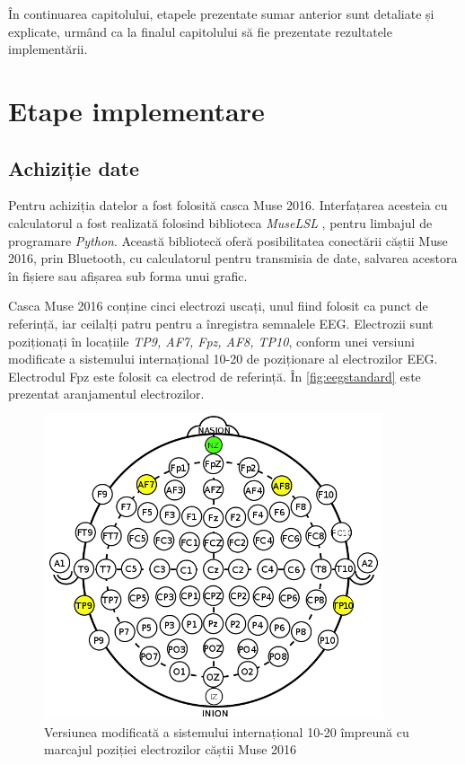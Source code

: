 În continuarea capitolului, etapele prezentate sumar anterior sunt detaliate și explicate, urmând ca la finalul capitolului să fie prezentate rezultatele implementării.

\section{Etape implementare}

\subsection{Achiziție date}\label{subsec:achizitie-date}
Pentru achiziția datelor a fost folosită casca Muse 2016. Interfațarea acesteia cu calculatorul a fost realizată folosind biblioteca \textit{MuseLSL} \cite{online:muselsl}, pentru limbajul de programare \textit{Python}. Această bibliotecă oferă posibilitatea conectării căștii Muse 2016, prin Bluetooth, cu calculatorul pentru transmisia de date, salvarea acestora în fișiere sau afișarea sub forma unui grafic.

Casca Muse 2016 conține cinci electrozi uscați, unul fiind folosit ca punct de referință, iar ceilalți patru pentru a înregistra semnalele EEG. Electrozii sunt poziționați în locațiile \textit{TP9, AF7, Fpz, AF8, TP10}, conform unei versiuni modificate a sistemului internațional 10-20 de poziționare al electrozilor EEG. Electrodul Fpz este folosit ca electrod de referință. În \autoref{fig:eegstandard} este prezentat aranjamentul electrozilor.

\begin{figure}[ht]
\centering
\includegraphics[width=10cm, keepaspectratio]{fig/cap3/EEGstandard.png}
\caption{Versiunea modificată a sistemului internațional 10-20 împreună cu marcajul poziției electrozilor căștii Muse 2016 \cite{eeg:2018}}
\label{fig:eegstandard}
\end{figure}

